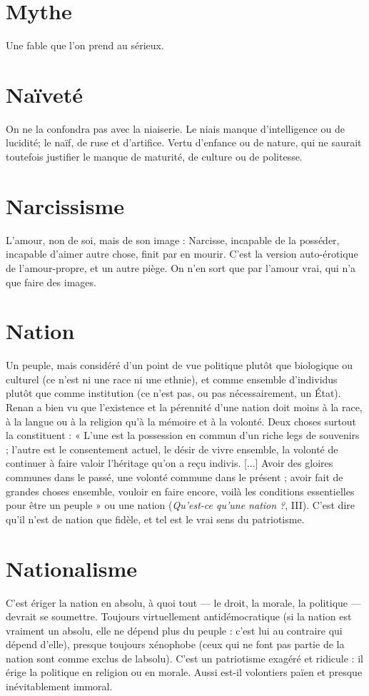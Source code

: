 \section{Mythe}
Une fable que l’on prend au sérieux.



\section{Naïveté}
On ne la confondra pas avec la niaiserie. Le niais manque d’intelligence
ou de lucidité; le naïf, de ruse et d'artifice. Vertu
d’enfance ou de nature, qui ne saurait toutefois justifier le manque de maturité,
de culture ou de politesse.

\section{Narcissisme}
L’amour, non de soi, mais de son image : Narcisse, incapable
de la posséder, incapable d’aimer autre chose, finit
par en mourir. C’est la version auto-érotique de l’amour-propre, et un autre
piège. On n’en sort que par l'amour vrai, qui n’a que faire des images.

\section{Nation}
Un peuple, mais considéré d’un point de vue politique plutôt que
biologique ou culturel (ce n’est ni une race ni une ethnie), et
comme ensemble d'individus plutôt que comme institution (ce n’est pas, ou
pas nécessairement, un État). Renan a bien vu que l'existence et la pérennité
d’une nation doit moins à la race, à la langue ou à la religion qu’à la mémoire
et à la volonté. Deux choses surtout la constituent : « L’une est la possession en
commun d’un riche legs de souvenirs ; l’autre est le consentement actuel, le
désir de vivre ensemble, la volonté de continuer à faire valoir l’héritage qu’on a
reçu indivis. [...] Avoir des gloires communes dans le passé, une volonté commune
dans le présent ; avoir fait de grandes choses ensemble, vouloir en faire
encore, voilà les conditions essentielles pour être un peuple » ou une nation
({\it Qu'est-ce qu'une nation ?}, III). C’est dire qu’il n’est de nation que fidèle, et tel
est le vrai sens du patriotisme.

\section{Nationalisme}
C'est ériger la nation en absolu, à quoi tout — le droit, la
morale, la politique — devrait se soumettre. Toujours virtuellement
antidémocratique (si la nation est vraiment un absolu, elle ne
dépend plus du peuple : c’est lui au contraire qui dépend d’elle), presque toujours
xénophobe (ceux qui ne font pas partie de la nation sont comme exclus
de labsolu). C’est un patriotisme exagéré et ridicule : il érige la politique en
religion ou en morale. Aussi est-il volontiers païen et presque inévitablement
immoral.

